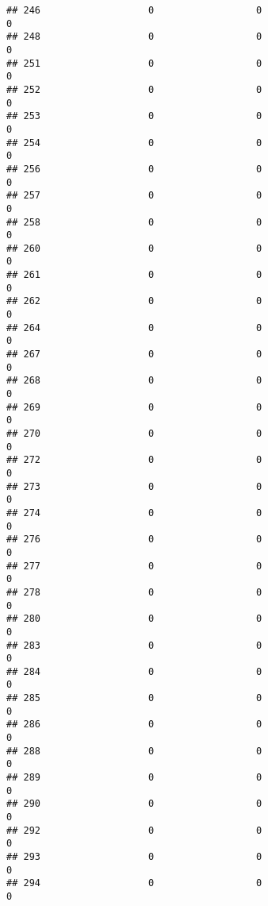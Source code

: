 \documentclass[
]{article}
\begin{document}
\begin{verbatim}
## 246                   0                  0                              0
## 248                   0                  0                              0
## 251                   0                  0                              0
## 252                   0                  0                              0
## 253                   0                  0                              0
## 254                   0                  0                              0
## 256                   0                  0                              0
## 257                   0                  0                              0
## 258                   0                  0                              0
## 260                   0                  0                              0
## 261                   0                  0                              0
## 262                   0                  0                              0
## 264                   0                  0                              0
## 267                   0                  0                              0
## 268                   0                  0                              0
## 269                   0                  0                              0
## 270                   0                  0                              0
## 272                   0                  0                              0
## 273                   0                  0                              0
## 274                   0                  0                              0
## 276                   0                  0                              0
## 277                   0                  0                              0
## 278                   0                  0                              0
## 280                   0                  0                              0
## 283                   0                  0                              0
## 284                   0                  0                              0
## 285                   0                  0                              0
## 286                   0                  0                              0
## 288                   0                  0                              0
## 289                   0                  0                              0
## 290                   0                  0                              0
## 292                   0                  0                              0
## 293                   0                  0                              0
## 294                   0                  0                              0

\end{verbatim}
\end{document}
